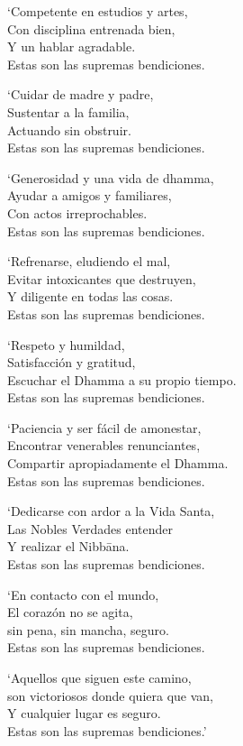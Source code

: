\clearpage

`Competente en estudios y artes,\\
Con disciplina entrenada bien,\\
Y un hablar agradable.\\
Estas son las supremas bendiciones.

`Cuidar de madre y padre,\\
Sustentar a la familia,\\
Actuando sin obstruir.\\
Estas son las supremas bendiciones.

`Generosidad y una vida de dhamma,\\
Ayudar a amigos y familiares,\\
Con actos irreprochables.\\
Estas son las supremas bendiciones.

`Refrenarse, eludiendo el mal,\\
Evitar intoxicantes que destruyen,\\
Y diligente en todas las cosas.\\
Estas son las supremas bendiciones.

`Respeto y humildad,\\
Satisfacción y gratitud,\\
Escuchar el Dhamma a su propio tiempo.\\
Estas son las supremas bendiciones.

`Paciencia y ser fácil de amonestar,\\
Encontrar venerables renunciantes,\\
Compartir apropiadamente el Dhamma.\\
Estas son las supremas bendiciones.

\clearpage

`Dedicarse con ardor a la Vida Santa,\\
Las Nobles Verdades entender\\
Y realizar el Nibbāna.\\
Estas son las supremas bendiciones.

`En contacto con el mundo,\\
El corazón no se agita,\\
sin pena, sin mancha, seguro.\\
Estas son las supremas bendiciones.

`Aquellos que siguen este camino,\\
son victoriosos donde quiera que van,\\
Y cualquier lugar es seguro.\\
Estas son las supremas bendiciones.'

